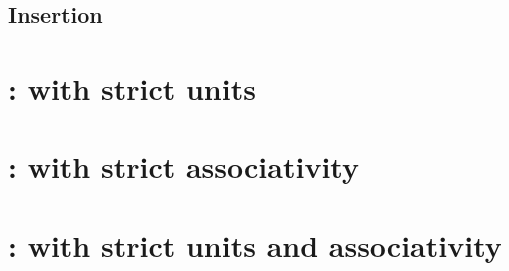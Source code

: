 \documentclass{cam-thesis}
\begin{document}
\section{Insertion}
\label{sec:insertion}

\chapter{\Cattsu : \Catt with strict units}
\label{cha:cattsu}

\chapter{\Cattsa : \Catt with strict associativity}
\label{cha:cattsa}

\chapter{\Cattsua : \Catt with strict units and associativity}
\label{cha:cattsua}


















\printbibliography
\end{document}
